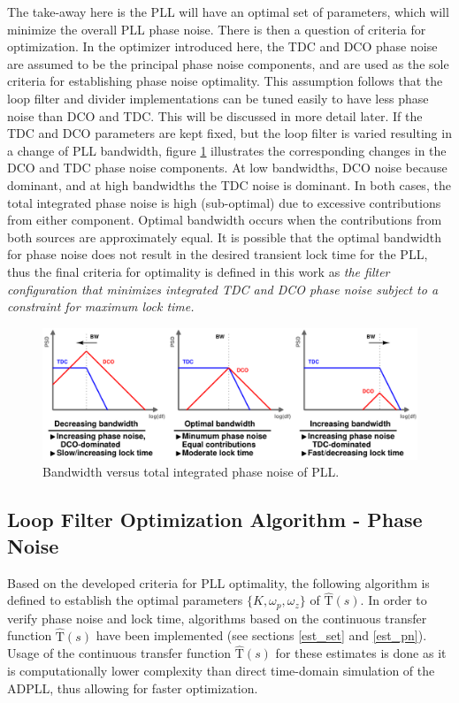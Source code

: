 The take-away here is the PLL will have an optimal set of parameters, which will minimize the overall PLL phase noise. There is then a question of criteria for optimization. In the optimizer introduced here, the TDC and DCO phase noise are assumed to be the principal phase noise components, and are used as the sole criteria for establishing phase noise optimality. This assumption follows that the loop filter and divider implementations can be tuned easily to have less phase noise than DCO and TDC. This will be discussed in more detail later. If the TDC and DCO parameters are kept fixed, but the loop filter is varied resulting in a change of PLL bandwidth, figure \ref{fig:bw_vs_pn2} illustrates the corresponding changes in the DCO and TDC phase noise components. At low bandwidths, DCO noise because dominant, and at high bandwidths the TDC noise is dominant. In both cases, the total integrated phase noise is high (sub-optimal) due to excessive contributions from either component. Optimal bandwidth occurs when the contributions from both sources are approximately equal. It is possible that the optimal bandwidth for phase noise does not result in the desired transient lock time for the PLL, thus the final criteria for optimality is defined in this work as \textit{the filter configuration that minimizes integrated TDC and DCO phase noise subject to a constraint for maximum lock time.}

\begin{figure}[htb!]
	\center\includegraphics[width=1\textwidth, angle=0]{figs/loop_bandwidth}
	\caption{Bandwidth versus total integrated phase noise of PLL.}
	\label{fig:bw_vs_pn2}
\end{figure}


\subsection{Loop Filter Optimization Algorithm - Phase Noise}\label{lf_optimizer}
Based on the developed criteria for PLL optimality, the following algorithm is defined to establish the optimal parameters $\{K, \omega_p, \omega_z\}$ of $\mathrm{\hat{T}}(s)$. In order to verify phase noise and lock time, algorithms based on the continuous transfer function $\mathrm{\hat{T}}(s)$ have been implemented (see sections \ref{est_set} and \ref{est_pn}). Usage of the continuous transfer function $\mathrm{\hat{T}}(s)$ for these estimates is done as it is computationally lower complexity than direct time-domain simulation of the ADPLL, thus allowing for faster optimization. 

